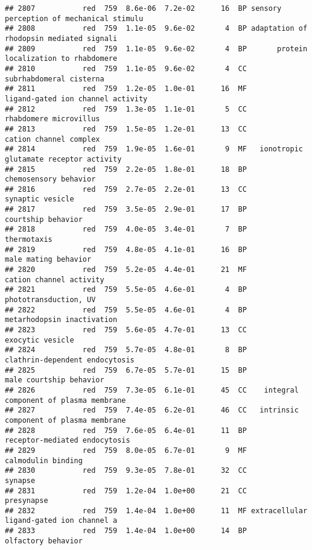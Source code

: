\documentclass[]{article}
\begin{document}
\begin{verbatim}
## 2807           red  759  8.6e-06  7.2e-02      16  BP sensory perception of mechanical stimulu
## 2808           red  759  1.1e-05  9.6e-02       4  BP adaptation of rhodopsin mediated signali
## 2809           red  759  1.1e-05  9.6e-02       4  BP       protein localization to rhabdomere
## 2810           red  759  1.1e-05  9.6e-02       4  CC                  subrhabdomeral cisterna
## 2811           red  759  1.2e-05  1.0e-01      16  MF        ligand-gated ion channel activity
## 2812           red  759  1.3e-05  1.1e-01       5  CC                   rhabdomere microvillus
## 2813           red  759  1.5e-05  1.2e-01      13  CC                   cation channel complex
## 2814           red  759  1.9e-05  1.6e-01       9  MF   ionotropic glutamate receptor activity
## 2815           red  759  2.2e-05  1.8e-01      18  BP                    chemosensory behavior
## 2816           red  759  2.7e-05  2.2e-01      13  CC                         synaptic vesicle
## 2817           red  759  3.5e-05  2.9e-01      17  BP                       courtship behavior
## 2818           red  759  4.0e-05  3.4e-01       7  BP                              thermotaxis
## 2819           red  759  4.8e-05  4.1e-01      16  BP                     male mating behavior
## 2820           red  759  5.2e-05  4.4e-01      21  MF                  cation channel activity
## 2821           red  759  5.5e-05  4.6e-01       4  BP                    phototransduction, UV
## 2822           red  759  5.5e-05  4.6e-01       4  BP               metarhodopsin inactivation
## 2823           red  759  5.6e-05  4.7e-01      13  CC                         exocytic vesicle
## 2824           red  759  5.7e-05  4.8e-01       8  BP           clathrin-dependent endocytosis
## 2825           red  759  6.7e-05  5.7e-01      15  BP                  male courtship behavior
## 2826           red  759  7.3e-05  6.1e-01      45  CC    integral component of plasma membrane
## 2827           red  759  7.4e-05  6.2e-01      46  CC   intrinsic component of plasma membrane
## 2828           red  759  7.6e-05  6.4e-01      11  BP            receptor-mediated endocytosis
## 2829           red  759  8.0e-05  6.7e-01       9  MF                       calmodulin binding
## 2830           red  759  9.3e-05  7.8e-01      32  CC                                  synapse
## 2831           red  759  1.2e-04  1.0e+00      21  CC                               presynapse
## 2832           red  759  1.4e-04  1.0e+00      11  MF extracellular ligand-gated ion channel a
## 2833           red  759  1.4e-04  1.0e+00      14  BP                       olfactory behavior

\end{verbatim}
\end{document}
